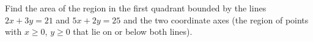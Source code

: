 Find the area of the region in the first quadrant bounded by the lines $2x+3y=21$ and $5x+2y=25$ and the two coordinate axes (the region of points with $x\ge0$, $y\ge0$ that lie on or below both lines).
